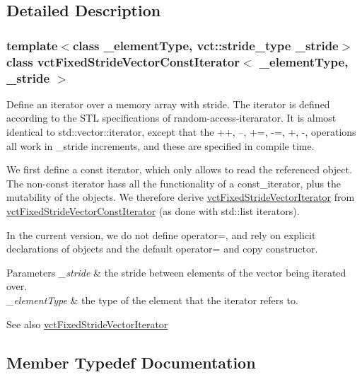 \subsection{Detailed Description}
\subsubsection*{template$<$class \+\_\+element\+Type, vct\+::stride\+\_\+type \+\_\+stride$>$class vct\+Fixed\+Stride\+Vector\+Const\+Iterator$<$ \+\_\+element\+Type, \+\_\+stride $>$}

Define an iterator over a memory array with stride. The iterator is defined according to the S\+T\+L specifications of random-\/access-\/iterarator. It is almost identical to std\+::vector\+::iterator, except that the ++, --, +=, -\/=, +, -\/, operations all work in \+\_\+stride increments, and these are specified in compile time.

We first define a const iterator, which only allows to read the referenced object. The non-\/const iterator hass all the functionality of a const\+\_\+iterator, plus the mutability of the objects. We therefore derive \hyperlink{classvct_fixed_stride_vector_iterator}{vct\+Fixed\+Stride\+Vector\+Iterator} from \hyperlink{classvct_fixed_stride_vector_const_iterator}{vct\+Fixed\+Stride\+Vector\+Const\+Iterator} (as done with std\+::list iterators).

In the current version, we do not define operator=, and rely on explicit declarations of objects and the default operator= and copy constructor.


\begin{DoxyParams}{Parameters}
{\em \+\_\+stride} & the stride between elements of the vector being iterated over.\\
\hline
{\em \+\_\+element\+Type} & the type of the element that the iterator refers to.\\
\hline
\end{DoxyParams}
\begin{DoxySeeAlso}{See also}
\hyperlink{classvct_fixed_stride_vector_iterator}{vct\+Fixed\+Stride\+Vector\+Iterator} 
\end{DoxySeeAlso}


\subsection{Member Typedef Documentation}
\hypertarget{classvct_fixed_stride_vector_const_iterator_ad92100e30e7cbc86c778a0a01a1d19e5}{}
